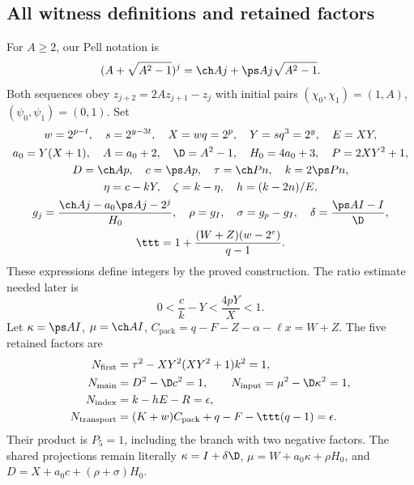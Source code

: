 \subsection{All witness definitions and retained factors}
For $A\ge2$, our Pell notation is
\begin{equation}\label{eq:pell}
 (A+\sqrt{A^2-1})^j=\ch A j+\ps A j\sqrt{A^2-1}.
\end{equation}
Both sequences obey $z_{j+2}=2Az_{j+1}-z_j$ with initial pairs
$(\chi_0,\chi_1)=(1,A)$, $(\psi_0,\psi_1)=(0,1)$.
Set
\begin{gather*}
 w=2^{p-t},\quad s=2^{y-3t},\quad X=wq=2^p,\quad Y=sq^3=2^y,\quad E=XY,\\
 a_0=Y(X+1),\quad A=a_0+2,\quad \D=A^2-1,\quad H_0=4a_0+3,\quad P=2XY^2+1,\\
 D=\ch A p,\quad c=\ps A p,\quad \tau=\ch P n,\quad k=2\ps P n,\\
 \eta=c-kY,\quad \zeta=k-\eta,\quad h=(k-2n)/E,\\
 g_j=\frac{\ch A j-a_0\ps A j-2^j}{H_0},\quad
 \rho=g_I,\quad \sigma=g_p-g_I,\quad \delta=\frac{\ps A I-I}{\D},\\
 \ttt=1+\frac{(W+Z)(w-2^e)}{q-1}.
\end{gather*}
These expressions define integers by the proved construction.
The ratio estimate needed later is
\begin{equation}\label{eq:ratio}
 0<\frac c k-Y<\frac{4pY}{X}<1.
\end{equation}
Let $\kappa=\ps A I$, $\mu=\ch A I$,
$C_{\mathrm{pack}}=q-F-Z-\alpha-\ell x=W+Z$. The five retained factors are
\begin{align*}
 N_{\mathrm{first}}&=\tau^2-XY^2(XY^2+1)k^2=1,\\
 N_{\mathrm{main}}&=D^2-\D c^2=1,\qquad
 N_{\mathrm{input}}=\mu^2-\D\kappa^2=1,\\
 N_{\mathrm{index}}&=k-hE-R=\epsilon,\\
 N_{\mathrm{transport}}&=(K+w)C_{\mathrm{pack}}+q-F-\ttt(q-1)=\epsilon.
\end{align*}
Their product is $P_5=1$, including the branch with two negative factors.
The shared projections remain literally
$\kappa=I+\delta\D$, $\mu=W+a_0\kappa+\rho H_0$, and
$D=X+a_0c+(\rho+\sigma)H_0$.

